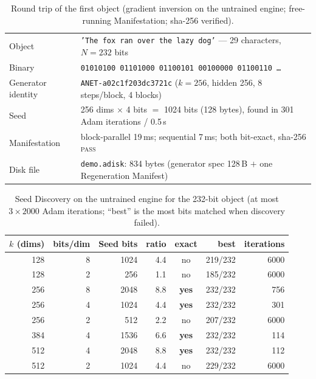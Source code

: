 \documentclass[11pt,a4paper]{article}
\theoremstyle{definition}
\theoremstyle{plain}
\theoremstyle{remark}
\begin{document}
\begin{table}[!htb]
\centering\small
\caption{Round trip of the first object (gradient inversion on the untrained engine; free-running
Manifestation; sha-256 verified).}
\label{tab:first}
\begin{tabular}{@{}ll@{}}
\toprule
Object & \texttt{'The fox ran over the lazy dog'} --- 29 characters, $N=232$ bits \\
Binary & \texttt{01010100 01101000 01100101 00100000 01100110 \ldots} \\
Generator identity & \texttt{ANET-a02c1f203dc3721c} ($k=256$, hidden 256, 8 steps/block, 4 blocks) \\
Seed & 256 dims $\times$ 4 bits $=$ 1024 bits (128 bytes), found in 301 Adam iterations / 0.5\,s \\
Manifestation & block-parallel 19\,ms; sequential 7\,ms; both bit-exact, sha-256 \textsc{pass} \\
Disk file & \texttt{demo.adisk}: 834 bytes (generator spec 128\,B $+$ one Regeneration Manifest) \\
\bottomrule
\end{tabular}
\end{table}

\begin{table}[!htb]
\centering\small
\caption{Seed Discovery on the untrained engine for the 232-bit object (at most $3\times2000$
Adam iterations; ``best'' is the most bits matched when discovery failed).}
\label{tab:sweep}
\begin{tabular}{@{}rrrrcrr@{}}
\toprule
$k$ (dims) & bits/dim & Seed bits & ratio & exact & best & iterations \\
\midrule
128 & 8 & 1024 & 4.4 & no & 219/232 & 6000 \\
128 & 2 & 256 & 1.1 & no & 185/232 & 6000 \\
256 & 8 & 2048 & 8.8 & \textbf{yes} & 232/232 & 756 \\
256 & 4 & 1024 & 4.4 & \textbf{yes} & 232/232 & 301 \\
256 & 2 & 512 & 2.2 & no & 207/232 & 6000 \\
384 & 4 & 1536 & 6.6 & \textbf{yes} & 232/232 & 114 \\
512 & 4 & 2048 & 8.8 & \textbf{yes} & 232/232 & 112 \\
512 & 2 & 1024 & 4.4 & no & 229/232 & 6000 \\
\bottomrule
\end{tabular}
\end{table}
\end{document}
